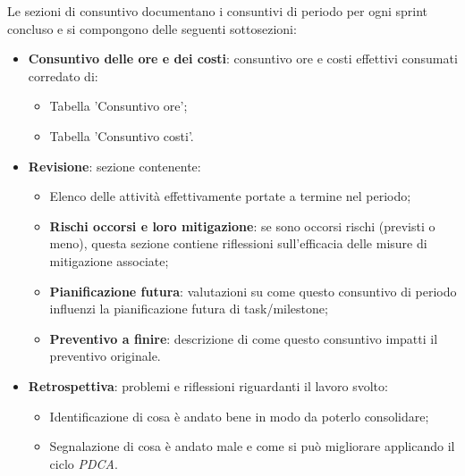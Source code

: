\documentclass[10pt, a4paper]{article}
\begin{document}
Le sezioni di consuntivo documentano i consuntivi di periodo per ogni sprint concluso e si compongono delle seguenti sottosezioni:
\begin{itemize}
    \item \textbf{Consuntivo delle ore e  dei costi}: consuntivo ore e costi effettivi consumati corredato di:
    \begin{itemize}
        \item Tabella 'Consuntivo ore';
        \item Tabella 'Consuntivo costi'.
    \end{itemize} 
    \item \textbf{Revisione}: sezione contenente:
    \begin{itemize}
        \item Elenco delle attività effettivamente portate a termine nel periodo;
        \item \textbf{Rischi occorsi e loro mitigazione}: se sono occorsi rischi (previsti o meno), questa sezione contiene riflessioni sull'efficacia delle misure di mitigazione associate;
        \item \textbf{Pianificazione futura}: valutazioni su come questo consuntivo di periodo influenzi la pianificazione futura di task/milestone;
        \item \textbf{Preventivo a finire}: descrizione di come questo consuntivo impatti il preventivo originale.
        
    \end{itemize}
    \item \textbf{Retrospettiva}: problemi e riflessioni riguardanti il lavoro svolto:
    \begin{itemize}
        \item Identificazione di cosa è andato bene in modo da poterlo consolidare;
        \item Segnalazione di cosa è andato male e come si può migliorare applicando il ciclo \textit{PDCA}.
    \end{itemize}


    
    
    
\end{itemize}
\end{document}
